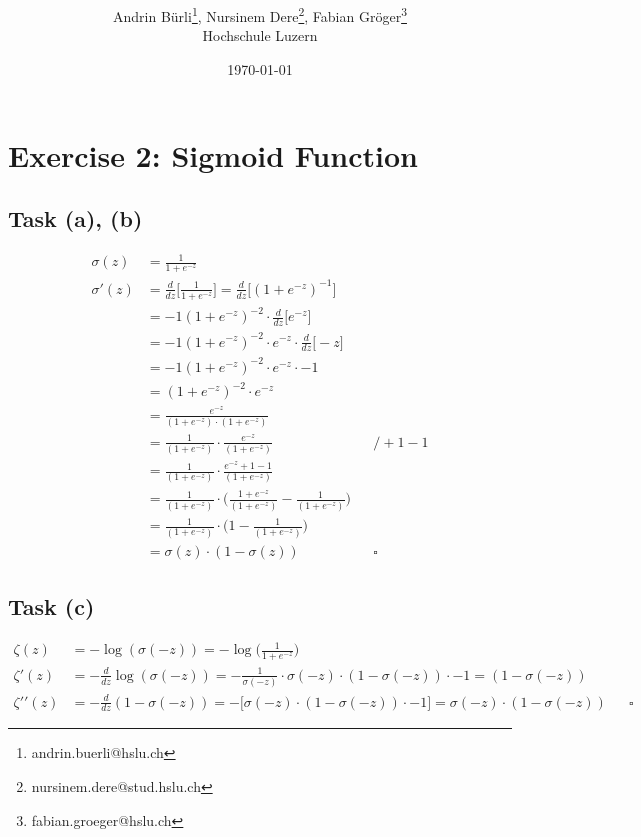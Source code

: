 \documentclass[onecolumn]{article}
\title{\spacecaps{Lab report: SW02 }\\ \normalsize \spacesc{TSM\_DeLearn} }
\author{Andrin Bürli\thanks{andrin.buerli@hslu.ch}, Nursinem Dere\thanks{nursinem.dere@stud.hslu.ch}, Fabian Gröger\thanks{fabian.groeger@hslu.ch}\\Hochschule Luzern}
\date{\today}
\begin{document}
\maketitle

\section{Exercise 2: Sigmoid Function}
\subsection{Task (a), (b)}
\begin{align*}
	\sigma(z) &= \frac{1}{1+e^{-z}} \\
	\sigma\prime(z) &= \frac{d}{dz} \Bigg[ \frac{1}{1+e^{-z}} \Bigg] = \frac{d}{dz} \Bigg[ (1+e^{-z})^{-1} \Bigg] \\
	&= -1 (1+e^{-z})^{-2} \cdot \frac{d}{dz} \Big[ e^{-z} \Big] \\
	&= -1 (1+e^{-z})^{-2} \cdot e^{-z} \cdot \frac{d}{dz} \Big[ -z \Big] \\
	&= -1 (1+e^{-z})^{-2} \cdot e^{-z} \cdot -1 \\
	&= (1+e^{-z})^{-2} \cdot e^{-z} \\
	&= \frac{e^{-z}}{(1+e^{-z}) \cdot (1+e^{-z})} \\
	&= \frac{1}{(1+e^{-z})} \cdot \frac{e^{-z}}{(1+e^{-z})} && /+1 -1 \\
	&= \frac{1}{(1+e^{-z})} \cdot \frac{e^{-z} +1 -1}{(1+e^{-z})} \\
	&= \frac{1}{(1+e^{-z})} \cdot \Bigg(\frac{1+ e^{-z}}{(1+e^{-z})} - \frac{1}{(1+e^{-z})}\Bigg) \\
	&= \frac{1}{(1+e^{-z})} \cdot \Bigg(1 - \frac{1}{(1+e^{-z})}\Bigg) \\
	&= \sigma(z) \cdot (1 - \sigma(z)) && \square
\end{align*}

\subsection{Task (c)}
\begin{align*}
	\zeta(z) &= -\log(\sigma(-z)) = -\log\Bigg(\frac{1}{1+e^{-z}}\Bigg) \\
	\zeta\prime(z) &= - \frac{d}{dz} \log (\sigma(-z)) = - \frac{1}{\sigma(-z)} \cdot \sigma(-z) \cdot (1 - \sigma(-z)) \cdot -1 = (1 - \sigma(-z)) \\
	\zeta\prime\prime(z) &= - \frac{d}{dz} (1 - \sigma(-z)) = - \Big[\sigma(-z) \cdot (1 - \sigma(-z)) \cdot -1 \Big] = \sigma(-z) \cdot (1 - \sigma(-z)) && \square
\end{align*}
\end{document}
